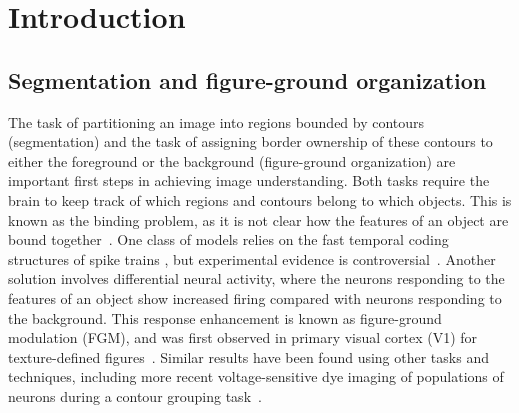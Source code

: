 \chapter{Introduction}
\label{sec:intro}


\section{Segmentation and figure-ground organization}

The task of partitioning an image into regions bounded by contours (segmentation) and the task of assigning border ownership of these contours to either the foreground or the background (figure-ground organization) are important first steps in achieving image understanding.
%
Both tasks require the brain to keep track of which regions and contours belong to which objects. This is known as the binding problem, as it is not clear how the features of an object are bound together~\citep{Treisman96b}. One class of models relies on the fast temporal coding structures of spike trains \citep{Singer99b}, but experimental evidence is controversial~\citep{Thiele_Stoner03,Roelfsema_etal04,Dong_etal08a}. Another solution involves differential neural activity, where the neurons responding to the features of an object show increased firing compared with neurons responding to the background. This response enhancement is known as figure-ground modulation (FGM), and was first observed in primary visual cortex (V1) for texture-defined figures~\citep{Lamme95}. Similar results have been found using other tasks and techniques, including more recent voltage-sensitive dye imaging of populations of neurons during a contour grouping task~\citep{Gilad_etal13}.

